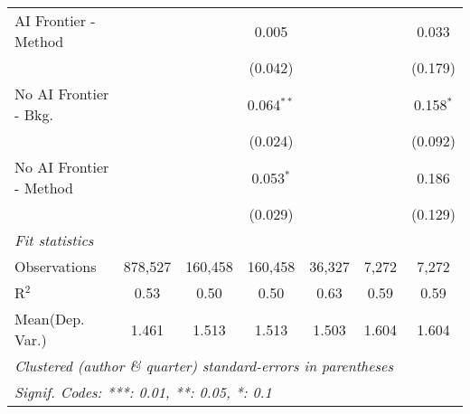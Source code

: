 \begin{tabular}{lcccccc}
   AI Frontier - Method    &         &               & 0.005         &         &         & 0.033\\   
                           &         &               & (0.042)       &         &         & (0.179)\\   
   No AI Frontier - Bkg.   &         &               & 0.064$^{**}$  &         &         & 0.158$^{*}$\\   
                           &         &               & (0.024)       &         &         & (0.092)\\   
   No AI Frontier - Method &         &               & 0.053$^{*}$   &         &         & 0.186\\   
                           &         &               & (0.029)       &         &         & (0.129)\\   
   \midrule
   \emph{Fit statistics}\\
   Observations            & 878,527 & 160,458       & 160,458       & 36,327  & 7,272   & 7,272\\  
   R$^2$                   & 0.53    & 0.50          & 0.50          & 0.63    & 0.59    & 0.59\\  
Mean(Dep. Var.) & 1.461 & 1.513 & 1.513 & 1.503 & 1.604 & 1.604 \\
   \midrule \midrule
   \multicolumn{7}{l}{\emph{Clustered (author \& quarter) standard-errors in parentheses}}\\
   \multicolumn{7}{l}{\emph{Signif. Codes: ***: 0.01, **: 0.05, *: 0.1}}\\
\end{tabular}
\par\endgroup
